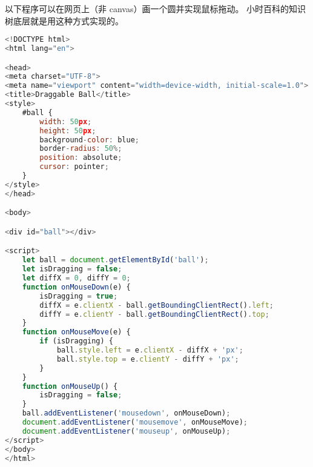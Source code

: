 
\begin{issues}
\issueDraft
\end{issues}

以下程序可以在网页上（非 canvas）画一个圆并实现鼠标拖动。 小时百科的知识树底层就是用这种方式实现的。

\begin{lstlisting}[language=js,caption=ball.html]
<!DOCTYPE html>
<html lang="en">

<head>
<meta charset="UTF-8">
<meta name="viewport" content="width=device-width, initial-scale=1.0">
<title>Draggable Ball</title>
<style>
	#ball {
		width: 50px;
		height: 50px;
		background-color: blue;
		border-radius: 50%;
		position: absolute;
		cursor: pointer;
	}
</style>
</head>

<body>

<div id="ball"></div>

<script>
	let ball = document.getElementById('ball');
	let isDragging = false;
	let diffX = 0, diffY = 0;
	function onMouseDown(e) {
		isDragging = true;
		diffX = e.clientX - ball.getBoundingClientRect().left;
		diffY = e.clientY - ball.getBoundingClientRect().top;	
	}
	function onMouseMove(e) {
		if (isDragging) {
			ball.style.left = e.clientX - diffX + 'px';
			ball.style.top = e.clientY - diffY + 'px';
		}
	}
	function onMouseUp() {
		isDragging = false;
	}
	ball.addEventListener('mousedown', onMouseDown);
	document.addEventListener('mousemove', onMouseMove);
	document.addEventListener('mouseup', onMouseUp);
</script>
</body>
</html>
\end{lstlisting}
